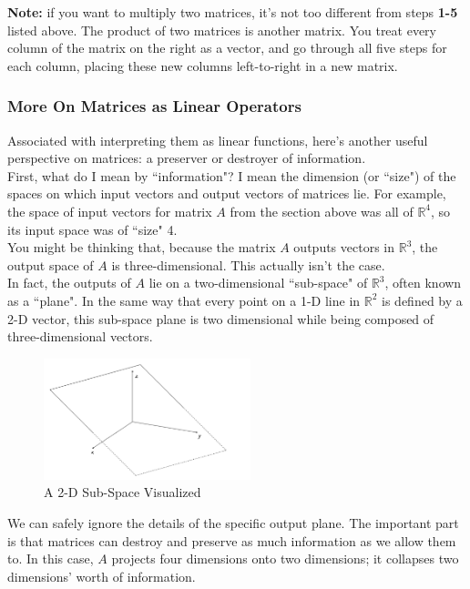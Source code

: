 \documentclass{article}
\begin{document}
\textbf{Note:} if you want to multiply two matrices, it's not too different from steps \textbf{1-5} listed above. The product of two matrices is another matrix. You treat every column of the matrix on the right as a vector, and go through all five steps for each column, placing these new columns left-to-right in a new matrix. 

\subsubsection{More On Matrices as Linear Operators}

Associated with interpreting them as linear functions, here's another useful perspective on matrices: a preserver or destroyer of information.\\ 

First, what do I mean by ``information"? I mean the dimension (or ``size") of the spaces on which input vectors and output vectors of matrices lie. For example, the space of input vectors for matrix $A$ from the section above was all of $\mathbb{R}^4$, so its input space was of ``size" 4. \\

You might be thinking that, because the matrix $A$ outputs vectors in $\mathbb{R}^3$, the output space of $A$ is three-dimensional. This actually isn't the case. \\

In fact, the outputs of $A$ lie on a two-dimensional ``sub-space" of $\mathbb{R}^3$, often known as a ``plane". In the same way that every point on a 1-D line in $\mathbb{R}^2$ is defined by a 2-D vector, this sub-space plane is two dimensional while being composed of three-dimensional vectors. \\

\begin{figure}[htp]
    \centering
    \includegraphics[width=6cm]{plane}
    \caption{A 2-D Sub-Space Visualized}
\end{figure}

We can safely ignore the details of the specific output plane. The important part is that matrices can destroy and preserve as much information as we allow them to. In this case, $A$ projects four dimensions onto two dimensions; it collapses two dimensions' worth of information. \\
\end{document}
